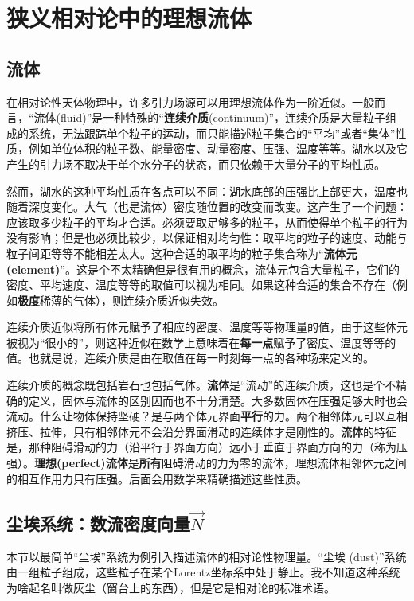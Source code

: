 \chapter{狭义相对论中的理想流体}
\label{chap4}
\section{流体}
\label{sec4.1}
在相对论性天体物理中，许多引力场源可以用理想流体作为一阶近似。一般而言，“流体(fluid)”是一种特殊的“\textbf{连续介质}(continuum)”，连续介质是大量粒子组成的系统，无法跟踪单个粒子的运动，而只能描述粒子集合的“平均”或者“集体”性质，例如单位体积的粒子数、能量密度、动量密度、压强、温度等等。湖水以及它产生的引力场不取决于单个水分子的状态，而只依赖于大量分子的平均性质。

然而，湖水的这种平均性质在各点可以不同：湖水底部的压强比上部更大，温度也随着深度变化。大气（也是流体）密度随位置的改变而改变。这产生了一个问题：应该取多少粒子的平均才合适。必须要取足够多的粒子，从而使得单个粒子的行为没有影响；但是也必须比较少，以保证相对均匀性：取平均的粒子的速度、动能与粒子间距等等不能相差太大。这种合适的取平均的粒子集合称为“\textbf{流体元 (element)}”。这是个不太精确但是很有用的概念，流体元包含大量粒子，它们的密度、平均速度、温度等等的取值可以视为相同。如果这种合适的集合不存在（例如\textbf{极度}稀薄的气体），则连续介质近似失效。

连续介质近似将所有体元赋予了相应的密度、温度等等物理量的值，由于这些体元被视为“很小的”，则这种近似在数学上意味着在\textbf{每一点}赋予了密度、温度等等的值。也就是说，连续介质是由在取值在每一时刻每一点的各种场来定义的。

连续介质的概念既包括岩石也包括气体。\textbf{流体}是“流动”的连续介质，这也是个不精确的定义，固体与流体的区别因而也不十分清楚。大多数固体在压强足够大时也会流动。什么让物体保持坚硬？是与两个体元界面\textbf{平行}的力。两个相邻体元可以互相挤压、拉伸，只有相邻体元不会沿分界面滑动的连续体才是刚性的。\textbf{流体}的特征是，那种阻碍滑动的力（沿平行于界面方向）远小于垂直于界面方向的力（称为压强）。\textbf{理想(perfect)流体}是\textbf{所有}阻碍滑动的力为零的流体，理想流体相邻体元之间的相互作用力只有压强。后面会用数学来精确描述这些性质。

\section{尘埃系统：数流密度向量$\vec{N}$}
\label{sec4.2}
本节以最简单“尘埃”系统为例引入描述流体的相对论性物理量。“尘埃 (dust)”系统由一组粒子组成，这些粒子在某个Lorentz坐标系中处于静止。我不知道这种系统为啥起名叫做灰尘（窗台上的东西），但是它是相对论的标准术语。

